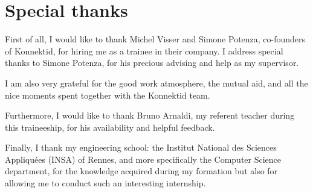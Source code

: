 \section{Special thanks}
\label{sec:thanks}

First of all, I would like to thank Michel {\sc Visser} and Simone {\sc Potenza}, co-founders of Konnektid, for hiring me as a trainee in their company.
I address special thanks to Simone {\sc Potenza}, for his precious advising and help as my supervisor.

I am also very grateful for the good work atmosphere, the mutual aid, and all the nice moments spent together with the Konnektid team.

Furthermore, I would like to thank Bruno {\sc Arnaldi}, my referent teacher during this traineeship, for his availability and helpful feedback.

Finally, I thank my engineering school: the \guillemotleft{} Institut National des Sciences Appliquées \guillemotright{} (INSA) of Rennes,
and more specifically the Computer Science department, for the knowledge acquired during my formation but also for allowing me to conduct such an interesting internship.
